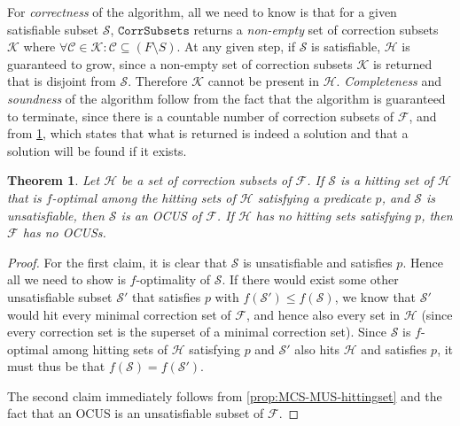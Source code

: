 \documentclass[twoside,11pt]{article}
\newcommand\m[1]{\mathcal{#1}}
\newtheorem{theorem}[thm]{Theorem}
\newcommand\comment[1]{\marginpar{\tiny #1}}
\renewcommand\comment[1]{#1}
\newcommand{\bart}[1]{{\comment{\color{OliveGreen}Bart: #1}}}
\newcommand\setstohit{\ensuremath{\m{H} }\xspace}
\newcommand\formula{\ensuremath{\m{F} }\xspace}
\newcommand\mm[1]{\ensuremath{#1}\xspace}
\newcommand\call[1]{\mm{\texttt{#1}}}
\newcommand\comus{\mm{\call{OCUS}}}
\newcommand\corrsubsets{\mm{\call{CorrSubsets}}}
\begin{document}
For \emph{correctness} of the algorithm, all we need to know is that for a given satisfiable subset $\m{S}$, \corrsubsets returns a \emph{non-empty} set of correction subsets~$\m{K}$ where $\forall \m{C} \in \m{K} : \m{C} \subseteq (F \setminus S)$. %
At any given step, if $\m{S}$ is satisfiable, $\setstohit$ is guaranteed to grow, since a non-empty set of correction subsets $\m{K}$ is returned that is disjoint from $\m{S}$. Therefore $\m{K}$ cannot be present in $\setstohit$. 
\emph{Completeness} and \emph{soundness} of the algorithm follow from the fact that the algorithm is guaranteed to terminate, since there is a countable number of correction subsets of $\formula$, and from %
\cref{thm:soundcomplete}, which states that what is returned is indeed a solution and that a solution will be found if it exists.  

\begin{theorem}\label{thm:soundcomplete}
	Let $\m{H}$ be a set of correction subsets of \formula. 
	If $\m{S}$ is a hitting set of $\m{H}$ that is $f$-optimal among the hitting sets of $\m{H}$ satisfying a predicate $p$, and  $\m{S}$ is unsatisfiable, then $\m{S}$ is an OCUS of $\formula$. 
	If  $\m{H}$ has no hitting sets satisfying $p$, then $\formula$ has no OCUSs.
\end{theorem}
\begin{proof}
For the first claim, it is clear that $\m{S}$ is unsatisfiable and satisfies $p$. Hence all we need to show is $f$-optimality of $\m{S}$.
If there would exist some other unsatisfiable subset $\m{S}'$ that satisfies $p$ with $f(\m{S}')\leq f(\m{S})$, we know that $\m{S}'$ would hit every minimal correction set of $\m{F}$, and hence also every set in $\m{H}$ (since every correction set is the superset of a minimal correction set).
Since $\m{S}$ is $f$-optimal among hitting sets of $\m{H}$ satisfying $p$ and $\m{S}'$ also hits $\m{H}$ and satisfies $p$, it must thus be that $f(\m{S})=f(\m{S}')$. 

The second claim immediately follows from \cref{prop:MCS-MUS-hittingset} and the fact that an OCUS is an unsatisfiable subset of $\formula$. 
\end{proof}
\end{document}
